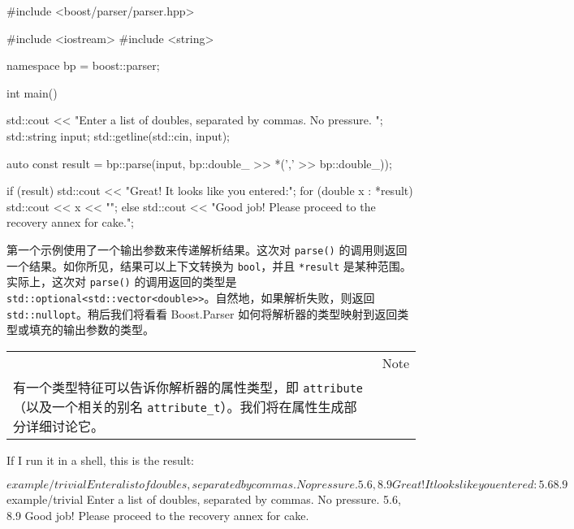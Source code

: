 \begin{code}
#include <boost/parser/parser.hpp>

#include <iostream>
#include <string>


namespace bp = boost::parser;

int main()
{
    std::cout << "Enter a list of doubles, separated by commas.  No pressure. ";
    std::string input;
    std::getline(std::cin, input);

    auto const result = bp::parse(input, bp::double_ >> *(',' >> bp::double_));

    if (result) {
        std::cout << "Great! It looks like you entered:\n";
        for (double x : *result) {
            std::cout << x << "\n";
        }
    } else {
        std::cout
            << "Good job!  Please proceed to the recovery annex for cake.\n";
    }
}
\end{code}

第一个示例使用了一个输出参数来传递解析结果。这次对 \texttt{parse()} 的调用则返回一个结果。如你所见，结果可以上下文转换为 \texttt{bool}，并且 \texttt{*result} 是某种范围。实际上，这次对 \texttt{parse()} 的调用返回的类型是 \texttt{std::optional<std::vector<double>>}。自然地，如果解析失败，则返回 \texttt{std::nullopt}。稍后我们将看看 Boost.Parser 如何将解析器的类型映射到返回类型或填充的输出参数的类型。

\begin{longtable}[]{@{}
  >{\raggedright\arraybackslash}p{}
  >{\raggedright\arraybackslash}p{}@{}}
\toprule\noalign{}
\endhead
\bottomrule\noalign{}
\endlastfoot
\begin{minipage}[t]{\linewidth}\raggedright
\end{minipage} & Note \\
有一个类型特征可以告诉你解析器的属性类型，即 \texttt{attribute}（以及一个相关的别名 \texttt{attribute\_t}）。我们将在属性生成部分详细讨论它。 & \\
\end{longtable}

If I run it in a shell, this is the result:

\begin{code}
$ example/trivial
Enter a list of doubles, separated by commas.  No pressure. 5.6,8.9
Great! It looks like you entered:
5.6
8.9
$ example/trivial
Enter a list of doubles, separated by commas.  No pressure. 5.6, 8.9
Good job!  Please proceed to the recovery annex for cake.
\end{code}


